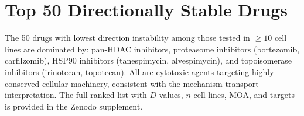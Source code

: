 \documentclass[11pt]{article}
\begin{document}
\section{Top 50 Directionally Stable Drugs}
\label{app:top50}

The 50 drugs with lowest direction instability among those tested in
$\geq 10$ cell lines are dominated by: pan-HDAC inhibitors,
proteasome inhibitors (bortezomib, carfilzomib), HSP90 inhibitors
(tanespimycin, alvespimycin), and topoisomerase inhibitors (irinotecan,
topotecan). All are cytotoxic agents targeting highly conserved cellular
machinery, consistent with the mechanism-transport interpretation.
The full ranked list with $D$ values, $n$ cell lines, MOA, and targets
is provided in the Zenodo supplement.
\end{document}
